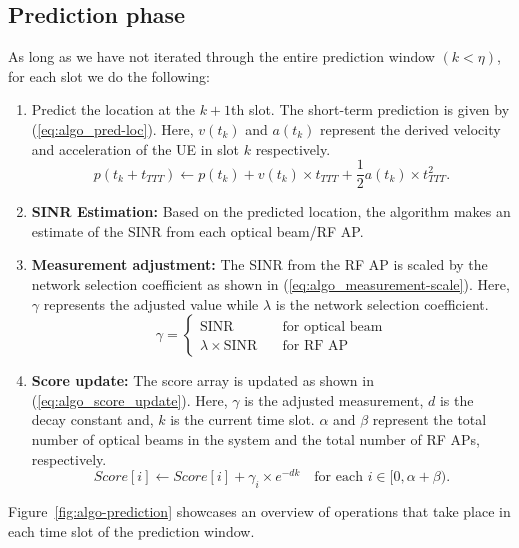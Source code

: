 \subsection{Prediction phase}
As long as we have not iterated through the entire prediction window $(k < \eta)$, for each slot we do the following:
\begin{enumerate}
    \item Predict the location at the $k+1$th slot. The short-term prediction is given by (\ref{eq:algo_pred-loc}). Here, $v(t_k)$ and $a(t_k)$ represent the derived velocity and acceleration of the UE in slot $k$ respectively.
    \begin{equation}
        p(t_k + t_{TTT}) \leftarrow p(t_k) + v(t_k) \times t_{TTT} + \frac{1}{2}a(t_k) \times t_{TTT}^2.
        \label{eq:algo_pred-loc}
    \end{equation}
    \item \textbf{SINR Estimation:} Based on the predicted location, the algorithm makes an estimate of the SINR from each optical beam/RF AP. 
    \item \textbf{Measurement adjustment: } The SINR from the RF AP is scaled by the network selection coefficient as shown in (\ref{eq:algo_measurement-scale}). Here, $\gamma$ represents the adjusted value while $\lambda$ is the network selection coefficient.
    \begin{equation}
        \gamma = 
\begin{cases} 
\text{SINR} \quad &\text{for optical beam} \\
\lambda \times \text{SINR} \quad &\text{for RF AP}
\end{cases}
\label{eq:algo_measurement-scale}
    \end{equation}
    \item \textbf{Score update:} The score array is updated as shown in (\ref{eq:algo_score_update}). Here, $\gamma$ is the adjusted measurement, $d$ is the decay constant and, $k$ is the current time slot. $\alpha$ and $\beta$ represent the total number of optical beams in the system and the total number of RF APs, respectively. 
    \begin{equation}
        Score[i] \leftarrow Score[i] + \gamma_i \times e^{-dk} \quad \text{for each } i \in [0, \alpha + \beta). 
        \label{eq:algo_score_update}
    \end{equation}

\end{enumerate}
Figure~\ref{fig:algo-prediction} showcases an overview of operations that take place in each time slot of the prediction window.

